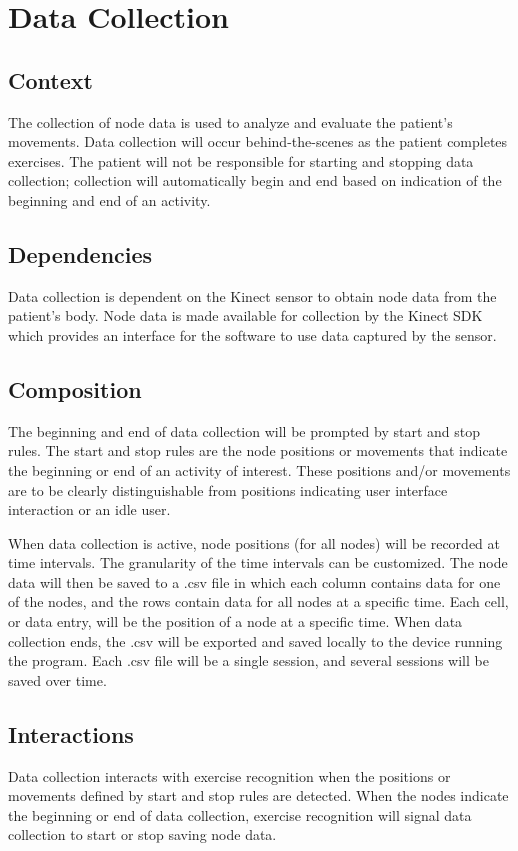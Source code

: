 \documentclass[onecolumn, draftclsnofoot,10pt, compsoc]{IEEEtran}
\begin{document}
\section{Data Collection}
\subsection{Context}
The collection of node data is used to analyze and evaluate the patient's movements. Data collection will occur behind-the-scenes as the patient completes exercises. The patient will not be responsible for starting and stopping data collection; collection will automatically begin and end based on indication of the beginning and end of an activity.

\subsection{Dependencies}
Data collection is dependent on the Kinect sensor to obtain node data from the patient's body. Node data is made available for collection by the Kinect SDK which provides an interface for the software to use data captured by the sensor\cite{KinectDevelop}.

\subsection{Composition}
The beginning and end of data collection will be prompted by start and stop rules. The start and stop rules are the node positions or movements that indicate the beginning or end of an activity of interest. These positions and/or movements are to be clearly distinguishable from positions indicating user interface interaction or an idle user. 

When data collection is active, node positions (for all nodes) will be recorded at time intervals. The granularity of the time intervals can be customized. The node data will then be saved to a .csv file in which each column contains data for one of the nodes, and the rows contain data for all nodes at a specific time. Each cell, or data entry, will be the position of a node at a specific time. When data collection ends, the .csv will be exported and saved locally to the device running the program. Each .csv file will be a single session, and several sessions will be saved over time.

\subsection{Interactions}
Data collection interacts with exercise recognition when the positions or movements defined by start and stop rules are detected. When the nodes indicate the beginning or end of data collection, exercise recognition will signal data collection to start or stop saving node data.
\end{document}

